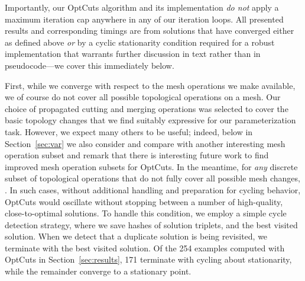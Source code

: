 
Importantly, our OptCuts algorithm and its implementation \emph{do not} apply a maximum iteration cap anywhere in any of our iteration loops. All presented results and corresponding timings are from solutions that have converged either as defined above \emph{or} by a cyclic stationarity condition required for a robust implementation that warrants further discussion in text rather than in pseudocode---we cover this immediately below.

First, while we converge with respect to the mesh operations we make available, we of course do not cover all possible topological operations on a mesh. Our choice of propagated cutting and merging operations was selected to cover the basic topology changes that we find suitably expressive for our parameterization task. However, we expect many others to be useful; indeed, below in Section~\ref{sec:var} we also consider and compare with another interesting mesh operation subset and remark that there is interesting future work to find improved mesh operation subsets for OptCuts. In the meantime, for \emph{any} discrete subset of topological operations that do not fully cover all possible mesh changes,  . In such cases, without additional handling and preparation for cycling behavior, OptCuts would oscillate without stopping between a number of high-quality, close-to-optimal solutions. To handle this condition, we employ a simple cycle detection strategy, where  we save hashes  of  solution triplets, and the best visited solution. When we detect that a duplicate solution is being revisited, we terminate with the best visited solution. Of the 254 examples computed with OptCuts in Section~\ref{sec:results}, 171 terminate with cycling about stationarity, while the remainder converge to a stationary point. 

